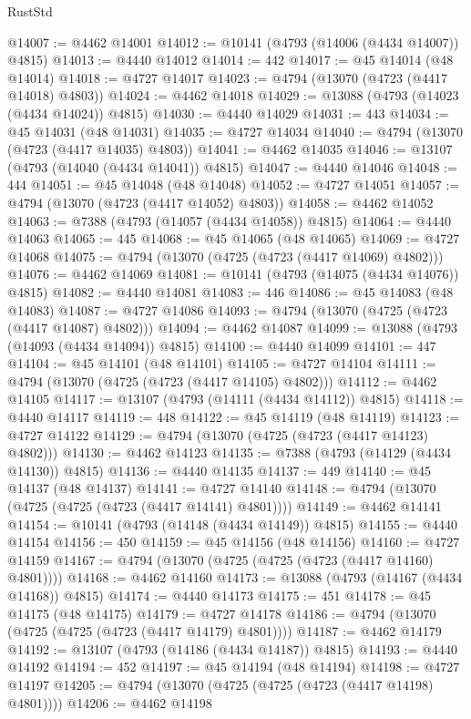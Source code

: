 \begin{lexlean}{RustStd}
\begin{coremodule}
@14007 := @4462 @14001
@14012 := @10141 (@4793 (@14006 (@4434 @14007)) @4815)
@14013 := @4440 @14012
@14014 := 442
@14017 := @45 @14014 (@48 @14014)
@14018 := @4727 @14017
@14023 := @4794 (@13070 (@4723 (@4417 @14018) @4803))
@14024 := @4462 @14018
@14029 := @13088 (@4793 (@14023 (@4434 @14024)) @4815)
@14030 := @4440 @14029
@14031 := 443
@14034 := @45 @14031 (@48 @14031)
@14035 := @4727 @14034
@14040 := @4794 (@13070 (@4723 (@4417 @14035) @4803))
@14041 := @4462 @14035
@14046 := @13107 (@4793 (@14040 (@4434 @14041)) @4815)
@14047 := @4440 @14046
@14048 := 444
@14051 := @45 @14048 (@48 @14048)
@14052 := @4727 @14051
@14057 := @4794 (@13070 (@4723 (@4417 @14052) @4803))
@14058 := @4462 @14052
@14063 := @7388 (@4793 (@14057 (@4434 @14058)) @4815)
@14064 := @4440 @14063
@14065 := 445
@14068 := @45 @14065 (@48 @14065)
@14069 := @4727 @14068
@14075 := @4794 (@13070 (@4725 (@4723 (@4417 @14069) @4802)))
@14076 := @4462 @14069
@14081 := @10141 (@4793 (@14075 (@4434 @14076)) @4815)
@14082 := @4440 @14081
@14083 := 446
@14086 := @45 @14083 (@48 @14083)
@14087 := @4727 @14086
@14093 := @4794 (@13070 (@4725 (@4723 (@4417 @14087) @4802)))
@14094 := @4462 @14087
@14099 := @13088 (@4793 (@14093 (@4434 @14094)) @4815)
@14100 := @4440 @14099
@14101 := 447
@14104 := @45 @14101 (@48 @14101)
@14105 := @4727 @14104
@14111 := @4794 (@13070 (@4725 (@4723 (@4417 @14105) @4802)))
@14112 := @4462 @14105
@14117 := @13107 (@4793 (@14111 (@4434 @14112)) @4815)
@14118 := @4440 @14117
@14119 := 448
@14122 := @45 @14119 (@48 @14119)
@14123 := @4727 @14122
@14129 := @4794 (@13070 (@4725 (@4723 (@4417 @14123) @4802)))
@14130 := @4462 @14123
@14135 := @7388 (@4793 (@14129 (@4434 @14130)) @4815)
@14136 := @4440 @14135
@14137 := 449
@14140 := @45 @14137 (@48 @14137)
@14141 := @4727 @14140
@14148 := @4794 (@13070 (@4725 (@4725 (@4723 (@4417 @14141) @4801))))
@14149 := @4462 @14141
@14154 := @10141 (@4793 (@14148 (@4434 @14149)) @4815)
@14155 := @4440 @14154
@14156 := 450
@14159 := @45 @14156 (@48 @14156)
@14160 := @4727 @14159
@14167 := @4794 (@13070 (@4725 (@4725 (@4723 (@4417 @14160) @4801))))
@14168 := @4462 @14160
@14173 := @13088 (@4793 (@14167 (@4434 @14168)) @4815)
@14174 := @4440 @14173
@14175 := 451
@14178 := @45 @14175 (@48 @14175)
@14179 := @4727 @14178
@14186 := @4794 (@13070 (@4725 (@4725 (@4723 (@4417 @14179) @4801))))
@14187 := @4462 @14179
@14192 := @13107 (@4793 (@14186 (@4434 @14187)) @4815)
@14193 := @4440 @14192
@14194 := 452
@14197 := @45 @14194 (@48 @14194)
@14198 := @4727 @14197
@14205 := @4794 (@13070 (@4725 (@4725 (@4723 (@4417 @14198) @4801))))
@14206 := @4462 @14198

\end{coremodule}
\end{lexlean}
